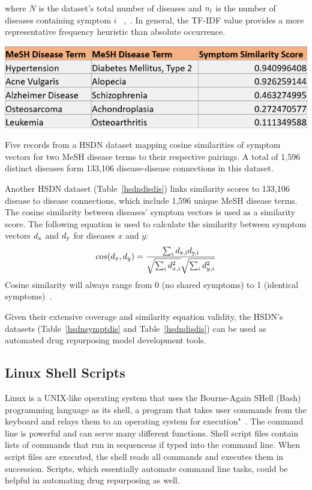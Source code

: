 \documentclass{IEEEtran}
\begin{document}
	\noindent where $N$ is the dataset's total number of diseases and $n\textsubscript{i}$ is the number of diseases containing symptom $i$ ~\cite{tfidf},~\cite{hsdn}.  In general, the TF-IDF value provides a more representative frequency heuristic than absolute occurrence. 
	\begin{table}[h]
		\centering
		\includegraphics[width=\linewidth]{hsdndisdis}
		\caption{\footnotesize  Five records from a HSDN dataset mapping cosine similarities of symptom vectors for two MeSH disease terms to their respective pairings.  A total of 1,596 distinct diseases form 133,106 disease-disease connections in this dataset.}
		\label{hsdndisdis}
	\end{table}
	
	Another HSDN dataset (Table~\ref{hsdndisdis}) links similarity scores to 133,106 disease to disease connections, which include 1,596 unique MeSH disease terms.  The cosine similarity between diseases' symptom vectors is used as a similarity score.  The following equation is used to calculate the similarity between symptom vectors $d\textsubscript{x}$ and $d\textsubscript{y}$ for diseases $x$ and $y$:
		\begin{equation}
		\label{cosine}
		 cos(d_{x},d_{y}) = \frac{\sum_{i}d\textsubscript{x,i}d\textsubscript{y,i}}{\sqrt{\sum_{i}d_{x,i}^{2}}\sqrt{\sum_{i}d_{y,i}^{2}}}
		\end{equation}
	\noindent Cosine similarity will always range from 0 (no shared symptoms) to 1 (identical symptoms)~\cite{hsdn}.
	
	Given their extensive coverage and similarity equation validity, the HSDN's datasets (Table~\ref{hsdnsymptdis} and Table~\ref{hsdndisdis}) can be used as automated drug repurposing model development tools. 
	
	\subsection{Linux Shell Scripts}
	Linux is a UNIX-like operating system that uses the Bourne-Again SHell (Bash) programming language as its shell, a program that takes user commands from the keyboard and relays them to an operating system for execution"~\cite{shell}.  The command line is powerful and can serve many different functions.  Shell script files contain lists of commands that run in sequence\textemdash as if typed into the command line.  When script files are executed, the shell reads all commands and executes them in succession.  Scripts, which essentially automate command line tasks, could be helpful in automating drug repurposing as well.
	
\end{document}
